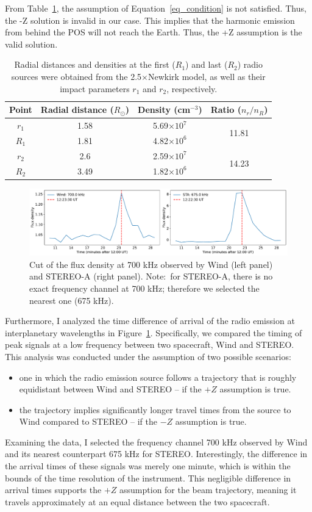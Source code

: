 From Table~\ref{table_negZ}, the assumption of Equation~\ref{eq_condition} is not satisfied. Thus, the -Z solution is invalid in our case. This implies that the harmonic emission from behind the POS will not reach the Earth. Thus, the +Z assumption is the valid solution.
\begin{table}[h!]
	\centering
	\caption{Radial distances and densities at the first ($R_1$) and last ($R_2$) radio sources were obtained from the 2.5$\times$Newkirk model, as well as their impact parameters $r_1$ and $r_2$, respectively.}
	\label{table_negZ}
	\begin{tabular}{cccc}
		\hline
		Point & Radial distance ($R_\odot$) & Density (cm$^{-3}$) & Ratio ($n_r/n_R$)\\ \hline
		$r_1$ & 1.58 & 5.69$\times10^7$ & \multirow{2}{*}{11.81}\\
		$R_1$ & 1.81 & 4.82$\times10^6$ & \\ \hline
		$r_2$ & 2.6 & 2.59$\times10^7$ & \multirow{2}{*}{14.23}\\
		$R_2$ & 3.49 & 1.82$\times10^6$ & \\ \hline
	\end{tabular}
\end{table}
\begin{figure}
	\centering
	\includegraphics[width=0.9\hsize]{chapter3/figs/wind_vs_sta_fluxdens.pdf}
	\caption{Cut of the flux density at 700 kHz observed by Wind (left panel) and STEREO-A (right panel). Note:\ for STEREO-A, there is no exact frequency channel at 700 kHz; therefore we selected the nearest one (675 kHz).}
	\label{fig_cutpower}
\end{figure}

Furthermore, I analyzed the time difference of arrival of the radio emission at interplanetary wavelengths in Figure~\ref{fig_cutpower}. Specifically, we compared the timing of peak signals at a low frequency between two spacecraft, Wind and STEREO. This analysis was conducted under the assumption of two possible scenarios:
\begin{itemize}
	\item one in which the radio emission source follows a trajectory that is roughly equidistant between Wind and STEREO -- if the $+Z$ assumption is true.
	\item the trajectory implies significantly longer travel times from the source to Wind compared to STEREO -- if the $-Z$ assumption is true.
\end{itemize}
Examining the data, I selected the frequency channel 700 kHz observed by Wind and its nearest counterpart 675 kHz for STEREO. Interestingly, the difference in the arrival times of these signals was merely one minute, which is within the bounds of the time resolution of the instrument. This negligible difference in arrival times supports the $+Z$ assumption for the beam trajectory, meaning it travels approximately at an equal distance between the two spacecraft.

